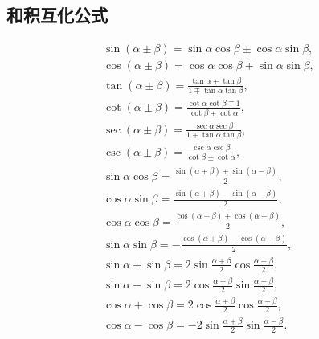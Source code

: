 \subsection{和积互化公式}
\begin{theorem}[和积互化公式]
\begin{gather}
	\sin(\alpha\pm\beta) = \sin\alpha\cos\beta\pm\cos\alpha\sin\beta,
	\label{equation:函数.三角函数.和积互化公式1} \\
	\cos(\alpha\pm\beta) = \cos\alpha\cos\beta\mp\sin\alpha\sin\beta,
	\label{equation:函数.三角函数.和积互化公式2} \\
	\tan(\alpha\pm\beta) = \frac{\tan\alpha\pm\tan\beta}{1\mp\tan\alpha\tan\beta},
	\label{equation:函数.三角函数.和积互化公式3} \\
	\cot(\alpha\pm\beta) = \frac{\cot\alpha\cot\beta\mp 1}{\cot\beta\pm\cot\alpha},
	\label{equation:函数.三角函数.和积互化公式4} \\
	\sec(\alpha\pm\beta) = \frac{\sec\alpha\sec\beta}{1\mp\tan\alpha\tan\beta},
	\label{equation:函数.三角函数.和积互化公式5} \\
	\csc(\alpha\pm\beta) = \frac{\csc\alpha\csc\beta}{\cot\beta\pm\cot\alpha},
	\label{equation:函数.三角函数.和积互化公式6} \\
	\sin \alpha \cos \beta = \frac{\sin (\alpha + \beta) + \sin (\alpha - \beta)}{2},
	\label{equation:函数.三角函数.和积互化公式7} \\
	\cos \alpha \sin \beta = \frac{\sin (\alpha + \beta) - \sin (\alpha - \beta)}{2},
	\label{equation:函数.三角函数.和积互化公式8} \\
	\cos \alpha \cos \beta = \frac{\cos (\alpha + \beta) + \cos (\alpha - \beta)}{2},
	\label{equation:函数.三角函数.和积互化公式9} \\
	\sin \alpha \sin \beta = -\frac{\cos (\alpha + \beta) - \cos (\alpha - \beta)}{2},
	\label{equation:函数.三角函数.和积互化公式10} \\
	\sin \alpha + \sin \beta = 2 \sin \frac{\alpha + \beta}{2} \cos \frac{\alpha - \beta}{2},
	\label{equation:函数.三角函数.和积互化公式11} \\
	\sin \alpha - \sin \beta = 2 \cos \frac{\alpha + \beta}{2} \sin \frac{\alpha - \beta}{2},
	\label{equation:函数.三角函数.和积互化公式12} \\
	\cos \alpha + \cos \beta = 2 \cos \frac{\alpha + \beta}{2} \cos \frac{\alpha - \beta}{2},
	\label{equation:函数.三角函数.和积互化公式13} \\
	\cos \alpha - \cos \beta = -2 \sin \frac{\alpha + \beta}{2} \sin \frac{\alpha - \beta}{2}.

\end{gather}
\end{theorem}

